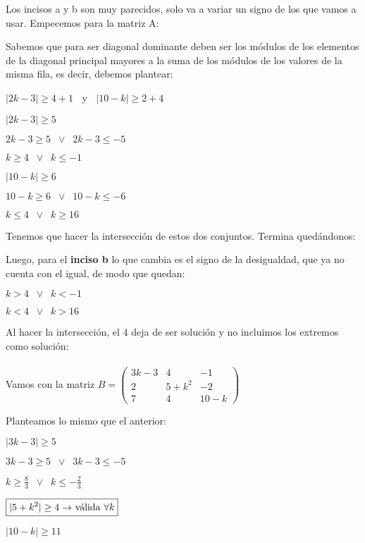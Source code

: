 \documentclass[11pt]{article}
\begin{document}
	Los incisos a y b son muy parecidos, solo va a variar un signo de los que vamos a usar. Empecemos para la matriz A:
	
	Sabemos que para ser diagonal dominante deben ser los módulos de los elementos de la diagonal principal mayores a la suma de los módulos de los valores de la misma fila, es decir, debemos plantear:
	
	$|2k-3| \ge 4 + 1 \;\;$ y $\;\;|10-k| \ge 2 + 4$
	
	$|2k-3| \ge 5$ 
	
	$2k-3 \ge 5 \;\; \lor \;\; 2k-3\le -5 $
	
	$\boxed{k \ge 4 \;\; \lor \;\; k \le -1}$
	
	$|10-k| \ge 6$
	
	$10-k \ge 6 \;\; \lor \;\; 10-k\le -6 $
	
	$\boxed{k \le 4 \;\; \lor \;\; k \ge 16}$
	
	Tenemos que hacer la intersección de estos dos conjuntos. Termina quedándonos:\\ \fcolorbox{black}{yellow}{$k \in (-\infty; -1] \cup \{4\} \cup [16; +\infty)$}
	
	Luego, para el \textbf{inciso b} lo que cambia es el signo de la desigualdad, que ya no cuenta con el igual, de modo que quedan:
	
	$\boxed{k > 4 \;\; \lor \;\; k < -1}$
	
	$\boxed{k < 4 \;\; \lor \;\; k > 16}$
	
	Al hacer la intersección, el 4 deja de ser solución y no incluimos los extremos como solución:\\
	\\
	
	Vamos con la matriz $B=\begin{pmatrix}
		3k-3 & 4 & -1 \\
		2 & 5+k^2 & -2 \\
		7 & 4 & 10-k
	\end{pmatrix}$

	Planteamos lo mismo que el anterior:
	
	$|3k-3| \ge 5$
	
	$3k-3 \ge 5 \;\; \lor \;\; 3k-3 \le -5$
	
	$\boxed{k \ge \frac{8}{3} \;\; \lor \;\; k \le -\frac{2}{3}}$
	
	$\boxed{|5+k^2|\ge 4 \rightarrow$ válida $\forall k}$
	
	$|10-k|\ge 11$
	
\end{document}
